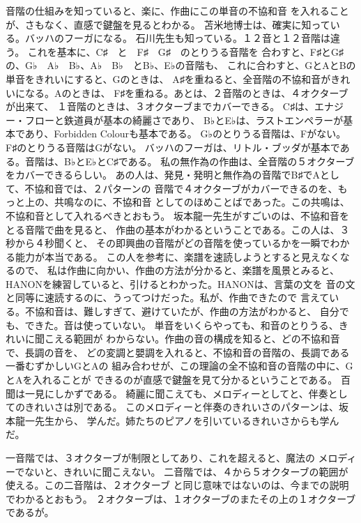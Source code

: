 \documentclass{jsarticle}
\begin{document}
         音階の仕組みを知っていると、楽に、作曲にこの単音の不協和音
    を入れることが、さもなく、直感で鍵盤を見るとわかる。
    苫米地博士は、確実に知っている。バッハのフーガになる。
    石川先生も知っている。１２音と１２音階は違う。
    これを基本に、C♯　と　F♯　G♯　のとりうる音階を
    合わすと、F♯とG♯の、G♭　A♭　B♭、A♭　B♭　とB♭、E♭の音階も、
    これに合わすと、GとAとBの単音をきれいにすると、Gのときは、
    A♯を重ねると、全音階の不協和音がきれいになる。Aのときは、
    F♯を重ねる。あとは、２音階のときは、４オクターブが出来て、
    １音階のときは、３オクターブまでカバーできる。
    C♯は、エナジー・フローと鉄道員が基本の綺麗さであり、
    B♭とE♭は、ラストエンペラーが基本であり、Forbidden Colourも基本である。
    G♭のとりうる音階は、Fがない。F♯のとりうる音階はGがない。
    バッハのフーガは、リトル・ブッダが基本である。音階は、B♭とE♭とC♯である。
    私の無作為の作曲は、全音階の５オクターブをカバーできるらしい。
    あの人は、発見・発明と無作為の音階でB♯でAとして、不協和音では、２パターンの
    音階で４オクターブがカバーできるのを、もっと上の、共鳴なのに、不協和音
    としてのほめことばであった。この共鳴は、不協和音として入れるべきとおもう。
    坂本龍一先生がすごいのは、不協和音をとる音階で曲を見ると、
    作曲の基本がわかるということである。この人は、３秒から４秒聞くと、
    その即興曲の音階がどの音階を使っているかを一瞬でわかる能力が本当である。
    この人を参考に、楽譜を速読しようとすると見えなくなるので、
    私は作曲に向かい、作曲の方法が分かると、楽譜を風景とみると、
    HANONを練習していると、引けるとわかった。HANONは、言葉の文を
    音の文と同等に速読するのに、うってつけだった。私が、作曲できたので
    言えている。不協和音は、難しすぎて、避けていたが、作曲の方法がわかると、
    自分でも、できた。音は使っていない。
    単音をいくらやっても、和音のとりうる、きれいに聞こえる範囲が
    わからない。作曲の音の構成を知ると、どの不協和音で、長調の音を、
    どの変調と嬰調を入れると、不協和音の音階の、長調である一番むずかしいGとAの
    組み合わせが、この理論の全不協和音の音階の中に、GとAを入れることが
    できるのが直感で鍵盤を見て分かるということである。
    百聞は一見にしかずである。
    綺麗に聞こえても、メロディーとしてと、伴奏としてのきれいさは別である。
    このメロディーと伴奏のきれいさのパターンは、坂本龍一先生から、
    学んだ。姉たちのピアノを引いているきれいさからも学んだ。



       一音階では、３オクターブが制限としてあり、これを超えると、魔法の
    メロディーでないと、きれいに聞こえない。
    二音階では、４から５オクターブの範囲が使える。この二音階は、２オクターブ
    と同じ意味ではないのは、今までの説明でわかるとおもう。
    ２オクターブは、１オクターブのまたその上の１オクターブであるが。
\end{document}
